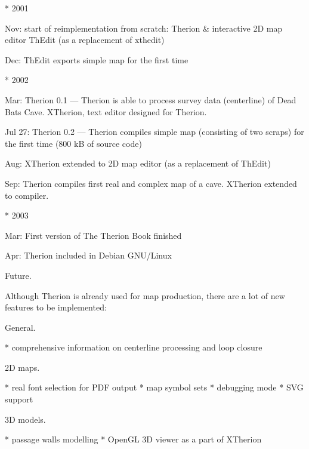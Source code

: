 * 2001

  Nov: start of reimplementation from scratch: 
       Therion \& interactive 2D map editor ThEdit
       (as a replacement of xthedit)

  Dec: ThEdit exports simple map for the first time

* 2002

  Mar: Therion 0.1 ---
       Therion is able to process survey data (centerline) of Dead Bats Cave.
       XTherion, text editor designed for Therion.

  Jul 27: Therion 0.2 ---
       Therion compiles simple map (consisting of two scraps)
       for the first time (800 kB of source code)

  Aug: XTherion extended to 2D map editor (as a replacement of ThEdit)

  Sep: Therion compiles first real and complex map of a cave. XTherion
       extended to compiler.


* 2003

  Mar: First version of The Therion Book finished

  Apr: Therion included in Debian GNU/Linux
\endlist


\subchapter Future.

Although Therion is already used for map production, there are a lot of 
new features to be implemented:

\subsubchapter General.

\list
* comprehensive information on centerline processing and loop closure
\endlist

\subsubchapter 2D maps.

\list
* real font selection for PDF output
* map symbol sets
* debugging mode
* SVG support
\endlist


\subsubchapter 3D models.

\list
* passage walls modelling
* OpenGL 3D viewer as a part of XTherion
\endlist

\endinput

